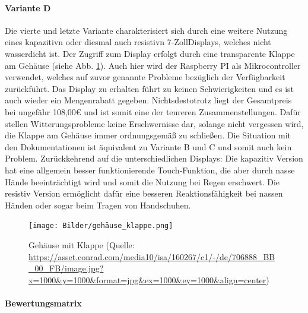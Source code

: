 \paragraph{Variante D}
Die vierte und letzte Variante charakterisiert sich durch eine weitere Nutzung eines \gls{kapazitiv}n oder diesmal auch \gls{resistiv}n 7-ZollDisplays, welches nicht wasserdicht ist. Der Zugriff zum Display erfolgt durch eine transparente Klappe am Gehäuse (siehe Abb.  \ref{fig:gehäuse_mit_klappe}). Auch hier wird der Raspberry PI als Mikrocontroller verwendet, welches auf zuvor genannte Probleme bezüglich der Verfügbarkeit zurückführt. Das Display zu erhalten führt zu keinen Schwierigkeiten und es ist auch wieder ein Mengenrabatt gegeben. Nichtsdestotrotz liegt der Gesamtpreis bei ungefähr 108,00€ und ist somit eine der teureren Zusammenstellungen. Dafür stellen Witterungsprobleme keine Erschwernisse dar, solange nicht vergessen wird, die Klappe am Gehäuse immer ordnungsgemäß zu schließen. Die Situation mit den Dokumentationen ist äquivalent zu Variante B und C und somit auch kein Problem. Zurückkehrend auf die unterschiedlichen Displays: Die \gls{kapazitiv} Version hat eine allgemein besser funktionierende Touch-Funktion, die aber durch nasse Hände beeinträchtigt wird und somit die Nutzung bei Regen erschwert. Die \gls{resistiv} Version ermöglicht dafür eine besseren Reaktionsfähigkeit bei nassen Händen oder sogar beim Tragen von Handschuhen.
\begin{figure}[ht]
	\centering
	\texttt{[image: Bilder/gehäuse\_klappe.png]}
	\caption[Gehäuse mit Klappe (Quelle: \url{https://asset.conrad.com/media10/isa/160267/c1/-/de/706888_BB_00_FB/image.jpg?x=1000&y=1000&format=jpg&ex=1000&ey=1000&align=center}, Zugriff am 19.02.2024]{Gehäuse mit Klappe (Quelle: \url{https://asset.conrad.com/media10/isa/160267/c1/-/de/706888_BB_00_FB/image.jpg?x=1000&y=1000&format=jpg&ex=1000&ey=1000&align=center})}
	\label{fig:gehäuse_mit_klappe}
\end{figure}
\newpage
\paragraph{Bewertungsmatrix}

